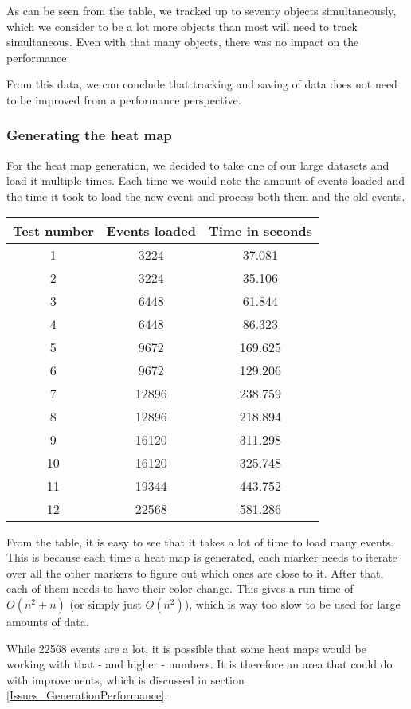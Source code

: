 As can be seen from the table, we tracked up to seventy objects simultaneously, which we consider to be a lot more objects than most will need to track simultaneous. Even with that many objects, there was no impact on the performance.

From this data, we can conclude that tracking and saving of data does not need to be improved from a performance perspective.

\subsubsection{Generating the heat map}
\label{Testing_Performance_Generating}

For the heat map generation, we decided to take one of our large datasets and load it multiple times. Each time we would note the amount of events loaded and the time it took to load the new event and process both them and the old events.

\begin{center}
	\begin{tabular}{| c | c | c |}
		\hline
		Test number & Events loaded & Time in seconds \\
		\hline
		1 & 3224 & 37.081 \\
		\hline
		2 & 3224 & 35.106 \\
		\hline
		3 & 6448 & 61.844 \\
		\hline
		4 & 6448 & 86.323 \\
		\hline
		5 & 9672 & 169.625 \\
		\hline
		6 & 9672 &  129.206 \\
		\hline
		7 & 12896 & 238.759 \\
		\hline
		8 & 12896 & 218.894 \\
		\hline
		9 & 16120 & 311.298 \\
		\hline
		10 & 16120 & 325.748 \\
		\hline
		11 & 19344 & 443.752 \\
		\hline
		12 & 22568 & 581.286 \\
		\hline
	\end{tabular}
\end{center}

From the table, it is easy to see that it takes a lot of time to load many events. This is because each time a heat map is generated, each marker needs to iterate over all the other markers to figure out which ones are close to it. After that, each of them needs to have their color change. This gives a run time of $O(n^2 + n)$ (or simply just $O(n^2)$), which is way too slow to be used for large amounts of data.

While 22568 events are a lot, it is possible that some heat maps would be working with that - and higher - numbers. It is therefore an area that could do with improvements, which is discussed in section \ref{Issues_GenerationPerformance}.